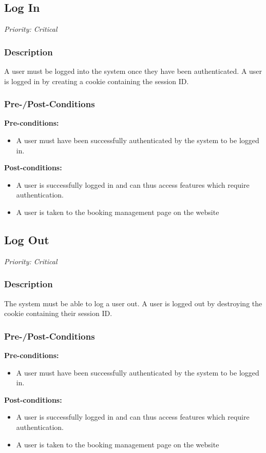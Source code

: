 \subsection{Log In}	
\textit{Priority: Critical} \\
\subsubsection{Description}
A user must be logged into the system once they have been authenticated. A user is logged in by creating a cookie containing the session ID. \\

\subsubsection{Pre-/Post-Conditions}
	\textbf{Pre-conditions:} 
	\begin{itemize}
		\item A user must have been successfully authenticated by the system to be logged in.
	\end{itemize}
	\textbf{Post-conditions:} 
	\begin{itemize}
		\item A user is successfully logged in and can thus access features which require authentication.
		\item A user is taken to the booking management page on the website
	\end{itemize}
	
\subsection{Log Out}	
\textit{Priority: Critical} \\
\subsubsection{Description}
The system must be able to log a user out. A user is logged out by destroying the cookie containing their session ID.\\

\subsubsection{Pre-/Post-Conditions}
	\textbf{Pre-conditions:} 
	\begin{itemize}
		\item A user must have been successfully authenticated by the system to be logged in.
	\end{itemize}
	\textbf{Post-conditions:} 
	\begin{itemize}
		\item A user is successfully logged in and can thus access features which require authentication.
		\item A user is taken to the booking management page on the website
	\end{itemize}

